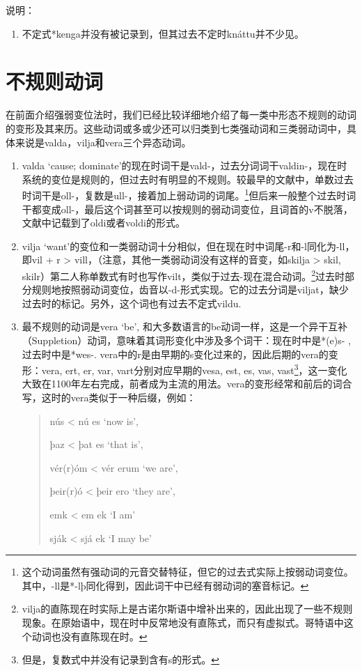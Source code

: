 说明：

\begin{enumerate}
    \item
          不定式*kenga并没有被记录到，但其过去不定时knáttu并不少见。
\end{enumerate}

\section{不规则动词}\label{不规则动词}

在前面介绍强弱变位法时，我们已经比较详细地介绍了每一类中形态不规则的动词的变形及其来历。这些动词或多或少还可以归类到七类强动词和三类弱动词中，具体来说是valda，vilja和vera三个异态动词。

\begin{enumerate}
    \item
          valda `cause; dominate‌'的现在时词干是vald-，过去分词词干valdin-，现在时系统的变位是规则的，但过去时有明显的不规则。较最早的文献中，单数过去时词干是oll-，复数是ull-，接着加上弱动词的词尾。\footnote{这个动词虽然有强动词的元音交替特征，但它的过去式实际上按弱动词变位。其中，-ll是*-lþ同化得到，因此词干中已经有弱动词的塞音标记。}但后来一般整个过去时词干都变成oll-，最后这个词甚至可以按规则的弱动词变位，且词首的v不脱落，文献中记载到了oldi或者voldi的形式。
    \item
          vilja `want‌'的变位和一类弱动词十分相似，但在现在时中词尾-r和-l同化为-ll，即vil + r > vill，（注意，其他一类弱动词没有这样的音变，如skilja
          > skil, skilr）第二人称单数式有时也写作vilt，类似于过去-现在混合动词。\footnote{vilja的直陈现在时实际上是古诺尔斯语中增补出来的，因此出现了一些不规则现象。在原始语中，现在时中反常地没有直陈式，而只有虚拟式。哥特语中这个动词也没有直陈现在时。}过去时部分规则地按照弱动词变位，齿音以-d-形式实现。它的过去分词是viljat，缺少过去时的标记。另外，这个词也有过去不定式vildu.
    \item
          最不规则的动词是vera `be‌', 和大多数语言的be动词一样，这是一个异干互补（Suppletion）动词，意味着其词形变化中涉及多个词干：现在时中是*(e)s-
          , 过去时中是*wes-. vera中的r是由早期的s变化过来的，因此后期的vera的变形：vera, ert, er, var, vart分别对应早期的vesa, est, es, vas, vast\footnote{但是，复数式中并没有记录到含有s的形式。}，这一变化大致在1100年左右完成，前者成为主流的用法。vera的变形经常和前后的词合写，这时的vera类似于一种后缀，例如：

          \begin{quote}
              nús < nú es `now is‌',

              þaz < þat es `that is‌',

              vér(r)óm < vér erum `we are‌',

              þeir(r)ó < þeir ero `they are‌',

              emk < em ek `I am'

              sják < sjá ek `I may be'
          \end{quote}
\end{enumerate}

